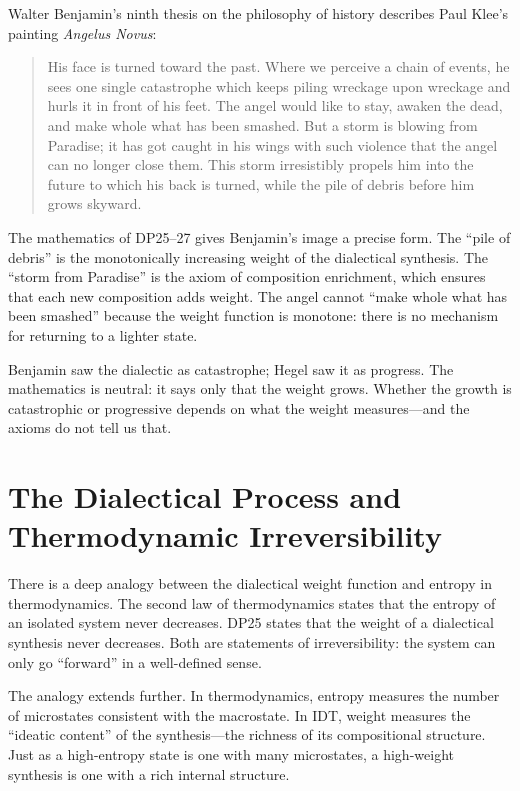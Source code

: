 \begin{interpretation}
\label{interp:benjamin-angel}
Walter Benjamin's ninth thesis on the philosophy of history describes
Paul Klee's painting \textit{Angelus Novus}:

\begin{quote}
His face is turned toward the past.  Where we perceive a chain of
events, he sees one single catastrophe which keeps piling wreckage upon
wreckage and hurls it in front of his feet.  The angel would like to
stay, awaken the dead, and make whole what has been smashed.  But a
storm is blowing from Paradise; it has got caught in his wings with such
violence that the angel can no longer close them.  This storm
irresistibly propels him into the future to which his back is turned,
while the pile of debris before him grows skyward.
\end{quote}

The mathematics of DP25--27 gives Benjamin's image a precise form.  The
``pile of debris'' is the monotonically increasing weight of the
dialectical synthesis.  The ``storm from Paradise'' is the axiom of
composition enrichment, which ensures that each new composition adds
weight.  The angel cannot ``make whole what has been smashed'' because
the weight function is monotone: there is no mechanism for returning
to a lighter state.

Benjamin saw the dialectic as catastrophe; Hegel saw it as progress.
The mathematics is neutral: it says only that the weight grows.
Whether the growth is catastrophic or progressive depends on what
the weight measures---and the axioms do not tell us that.
\end{interpretation}

\section{The Dialectical Process and Thermodynamic Irreversibility}

There is a deep analogy between the dialectical weight function and
entropy in thermodynamics.  The second law of thermodynamics states
that the entropy of an isolated system never decreases.  DP25 states
that the weight of a dialectical synthesis never decreases.  Both
are statements of irreversibility: the system can only go ``forward''
in a well-defined sense.

The analogy extends further.  In thermodynamics, entropy measures the
number of microstates consistent with the macrostate.  In IDT, weight
measures the ``ideatic content'' of the synthesis---the richness of
its compositional structure.  Just as a high-entropy state is one
with many microstates, a high-weight synthesis is one with a rich
internal structure.

